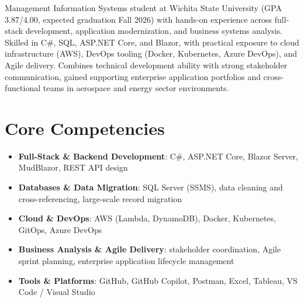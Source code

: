 \documentclass[11pt,a4paper,sans]{moderncv}
\begin{document}
\makecvtitle


\vspace{6pt}
\small{Management Information Systems student at Wichita State University (GPA 3.87/4.00, expected graduation Fall 2026) with hands-on experience across full-stack development, application modernization, and business systems analysis. Skilled in C\#, SQL, ASP.NET Core, and Blazor, with practical exposure to cloud infrastructure (AWS), DevOps tooling (Docker, Kubernetes, Azure DevOps), and Agile delivery. Combines technical development ability with strong stakeholder communication, gained supporting enterprise application portfolios and cross-functional teams in aerospace and energy sector environments.}


\section{Core Competencies}
\vspace{1pt}
\begin{itemize}

\item \textbf{Full-Stack \& Backend Development}: C\#, ASP.NET Core, Blazor Server, MudBlazor, REST API design

\item \textbf{Databases \& Data Migration}: SQL Server (SSMS), data cleaning and cross-referencing, large-scale record migration

\item \textbf{Cloud \& DevOps}: AWS (Lambda, DynamoDB), Docker, Kubernetes, GitOps, Azure DevOps

\item \textbf{Business Analysis \& Agile Delivery}: stakeholder coordination, Agile sprint planning, enterprise application lifecycle management

\item \textbf{Tools \& Platforms}: GitHub, GitHub Copilot, Postman, Excel, Tableau, VS Code / Visual Studio

\end{itemize}

\end{document}
